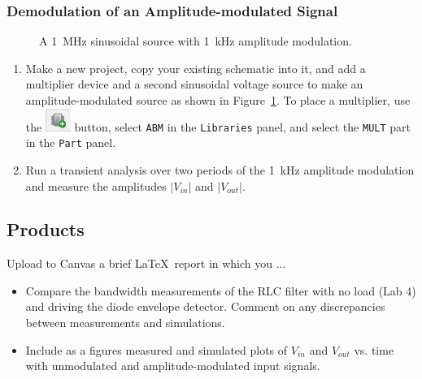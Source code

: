 \documentclass[11pt]{article}
\begin{document}
\subsubsection*{Demodulation of an Amplitude-modulated Signal}
  \begin{figure}[h]
  \centering
  \caption{A 1~MHz sinusoidal source with 1~kHz amplitude modulation.}
  \label{fig:amplitudemod}
  \end{figure}
\begin{enumerate}
\item Make a new project, copy your existing schematic into it, and
  add a multiplier device and a second sinusoidal voltage source to
  make an amplitude-modulated source as shown in
  Figure~\ref{fig:amplitudemod}. To place a multiplier, use the
  \includegraphics{OrCAD_AddPart.png} button, select \texttt{ABM} in
  the \texttt{Libraries} panel, and select the \texttt{MULT} part in
  the \texttt{Part} panel.

\item Run a transient analysis over two periods of the 1~kHz amplitude
  modulation and measure the amplitudes $|V_{in}|$ and $|V_{out}|$.

\end{enumerate}

\subsection*{Products}

Upload to Canvas a brief \LaTeX\ report in which you ...
\begin{itemize}
\item Compare the bandwidth measurements of the RLC filter with no
  load (Lab 4) and driving the diode envelope detector. Comment on any
  discrepancies between measurements and simulations.

\item Include as a figures measured and simulated plots of $V_{in}$
  and $V_{out}$ vs. time with unmodulated and amplitude-modulated
  input signals.
\end{itemize}
\end{document}

